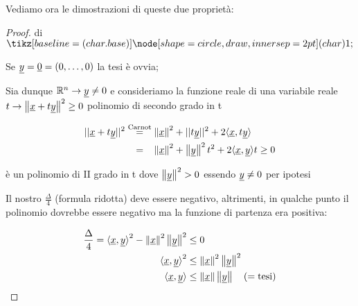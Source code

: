 Vediamo ora le dimostrazioni di queste due proprietà:

\begin{proof} di \(\circled{1}\)

    Se \(\underline{y} = \underline{0} = (0, \ldots ,0)\) la tesi è ovvia;

    Sia dunque \(\mathbb{R}^{n}  \rightarrow \underline{y} \neq 0\) e consideriamo la funzione reale di una variabile reale \(t \rightarrow \left\lVert\underline{x}+t\underline{y}\right\rVert^{2}\ge 0\) polinomio di secondo grado in t

    \begin{align*}
        ||\underline{x} + t\underline{y}|| ^{2} & \overset{\text{Carnot}}{=} \left\lVert\underline{x}\right\rVert^{2} + ||t\underline{y}||^{2} + 2\langle \underline{x},t\underline{y} \rangle \\
                            & ~~\, = ~~\, \left\lVert\underline{x}\right\rVert^{2} + \left\lVert\underline{y}\right\rVert^{2}t^{2} + 2 \langle\underline{x},\underline{y}\rangle t \ge 0
    \end{align*}

    è un polinomio di II grado in t dove \(\left\lVert\underline{y}\right\rVert^{2}> 0 \) essendo \(\underline{y} \neq 0\) per ipotesi

    Il nostro \(\frac{\Delta}{4}\) (formula ridotta) deve essere negativo, altrimenti, in qualche punto il polinomio dovrebbe essere negativo ma la funzione di partenza era positiva:

    \begin{align*}
        \frac{\Delta}{4} = {\langle\underline{x},\underline{y}\rangle}^{2} - \left\lVert\underline{x}\right\rVert^{2}\left\lVert\underline{y}\right\rVert^{2} & \le 0                                       \\
        {\langle\underline{x},\underline{y}\rangle}^{2}                                               & \le \left\lVert\underline{x}\right\rVert^{2}\left\lVert\underline{y}\right\rVert^{2}                \\
        \langle\underline{x},\underline{y}\rangle                                                     & \le \left\lVert\underline{x}\right\rVert \left\lVert\underline{y}\right\rVert \quad (= \text{tesi})
    \end{align*}

\end{proof}

\filbreak{}

